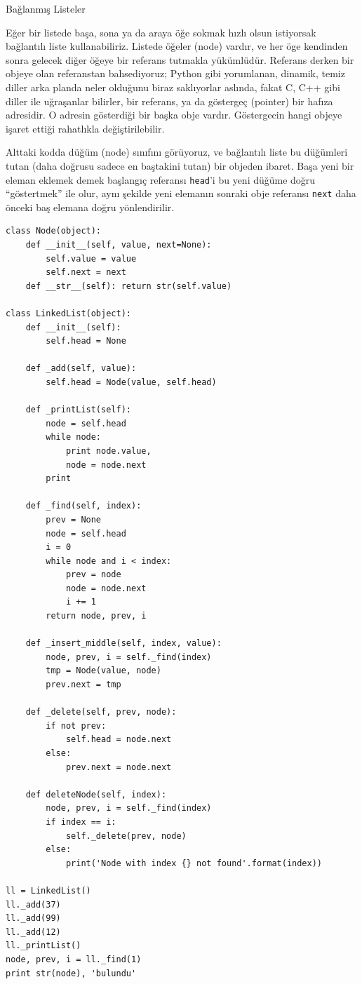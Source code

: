\documentclass[12pt,fleqn]{article}\usepackage{../../common}
\begin{document}
Bağlanmış Listeler

Eğer bir listede başa, sona ya da araya öğe sokmak hızlı olsun istiyorsak
bağlantılı liste kullanabiliriz. Listede öğeler (node) vardır, ve her öge
kendinden sonra gelecek diğer öğeye bir referans tutmakla
yükümlüdür. Referans derken bir objeye olan referanstan bahsediyoruz;
Python gibi yorumlanan, dinamik, temiz diller arka planda neler olduğunu
biraz saklıyorlar aslında, fakat C, C++ gibi diller ile uğraşanlar
bilirler, bir referans, ya da göstergeç (pointer) bir hafıza adresidir. O
adresin gösterdiği bir başka obje vardır. Göstergecin hangi objeye işaret
ettiği rahatlıkla değiştirilebilir.

Alttaki kodda düğüm (node) sınıfını görüyoruz, ve bağlantılı liste bu
düğümleri tutan (daha doğrusu sadece en baştakini tutan) bir objeden
ibaret. Başa yeni bir eleman eklemek demek başlangıç referansı
\verb!head!'i bu yeni düğüme doğru ``göstertmek'' ile olur, aynı şekilde
yeni elemanın sonraki obje referansı \verb!next! daha önceki baş elemana
doğru yönlendirilir. 

\begin{verbatim}
class Node(object):
    def __init__(self, value, next=None):
        self.value = value
        self.next = next
    def __str__(self): return str(self.value)
        
class LinkedList(object):
    def __init__(self):
        self.head = None
  
    def _add(self, value):
        self.head = Node(value, self.head)
            
    def _printList(self):
        node = self.head
        while node:
            print node.value,
            node = node.next
        print 
            
    def _find(self, index):
        prev = None
        node = self.head
        i = 0
        while node and i < index:
            prev = node
            node = node.next
            i += 1
        return node, prev, i

    def _insert_middle(self, index, value):
        node, prev, i = self._find(index)
        tmp = Node(value, node)
        prev.next = tmp
        
    def _delete(self, prev, node):
        if not prev:
            self.head = node.next
        else:
            prev.next = node.next
    
    def deleteNode(self, index):
        node, prev, i = self._find(index)
        if index == i:
            self._delete(prev, node)
        else:
            print('Node with index {} not found'.format(index))

ll = LinkedList()
ll._add(37)
ll._add(99)
ll._add(12)
ll._printList()
node, prev, i = ll._find(1)
print str(node), 'bulundu'
\end{verbatim}
\end{document}
